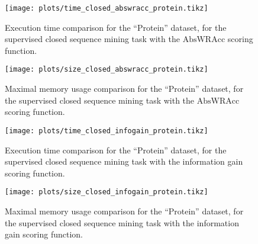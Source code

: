 \documentclass{sigkddExp}
\newcommand{\abswracc}{\mathrm{AbsWRAcc}}
\begin{document}
\begin{figure}[!hbtp]
	\centering
	\texttt{[image: plots/time\_closed\_abswracc\_protein.tikz]}
	\caption{Execution time comparison for the ``Protein'' dataset, for the supervised closed sequence mining task with the \(\abswracc\) scoring function.}
	\label{fig:time_closed_abswracc_protein}
\end{figure}

\begin{figure}[!hbtp]
	\centering
	\texttt{[image: plots/size\_closed\_abswracc\_protein.tikz]}
	\caption{Maximal memory usage comparison for the ``Protein'' dataset, for the supervised closed sequence mining task with the \(\abswracc\) scoring function.}
	\label{fig:size_closed_abswracc_protein}
\end{figure}

\begin{figure}[!hbtp]
	\centering
	\texttt{[image: plots/time\_closed\_infogain\_protein.tikz]}
	\caption{Execution time comparison for the ``Protein'' dataset, for the supervised closed sequence mining task with the information gain scoring function.}
	\label{fig:time_closed_infogain_protein}
\end{figure}

\begin{figure}[!hbtp]
	\centering
	\texttt{[image: plots/size\_closed\_infogain\_protein.tikz]}
	\caption{Maximal memory usage comparison for the ``Protein'' dataset, for the supervised closed sequence mining task with the information gain scoring function.}
	\label{fig:size_closed_infogain_protein}
\end{figure}
\end{document}
